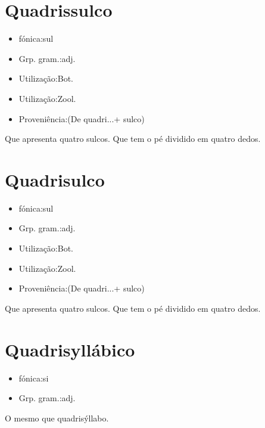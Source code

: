 \section{Quadrissulco}
\begin{itemize}
\item {fónica:sul}
\end{itemize}
\begin{itemize}
\item {Grp. gram.:adj.}
\end{itemize}
\begin{itemize}
\item {Utilização:Bot.}
\end{itemize}
\begin{itemize}
\item {Utilização:Zool.}
\end{itemize}
\begin{itemize}
\item {Proveniência:(De \textunderscore quadri...\textunderscore  + \textunderscore sulco\textunderscore )}
\end{itemize}
Que apresenta quatro sulcos.
Que tem o pé dividido em quatro dedos.
\section{Quadrisulco}
\begin{itemize}
\item {fónica:sul}
\end{itemize}
\begin{itemize}
\item {Grp. gram.:adj.}
\end{itemize}
\begin{itemize}
\item {Utilização:Bot.}
\end{itemize}
\begin{itemize}
\item {Utilização:Zool.}
\end{itemize}
\begin{itemize}
\item {Proveniência:(De \textunderscore quadri...\textunderscore  + \textunderscore sulco\textunderscore )}
\end{itemize}
Que apresenta quatro sulcos.
Que tem o pé dividido em quatro dedos.
\section{Quadrisyllábico}
\begin{itemize}
\item {fónica:si}
\end{itemize}
\begin{itemize}
\item {Grp. gram.:adj.}
\end{itemize}
O mesmo que \textunderscore quadrisýllabo\textunderscore .

